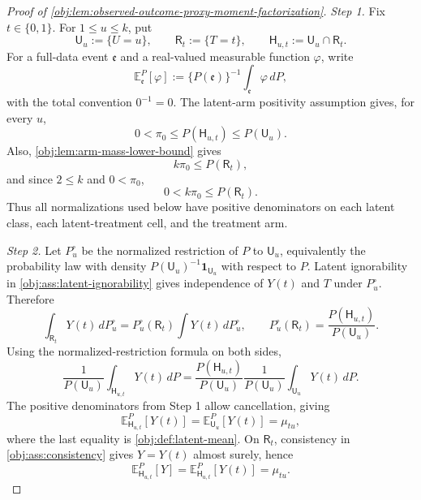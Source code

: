 \begin{proof}[Proof of \cref{obj:lem:observed-outcome-proxy-moment-factorization}]
\emph{Step 1.} Fix \(t\in\{0,1\}\).  For \(1\le u\le k\), put
\[
\mathsf U_u:=\{U=u\},\qquad
\mathsf R_t:=\{T=t\},\qquad
\mathsf H_{u,t}:=\mathsf U_u\cap\mathsf R_t .
\]
For a full-data event \(\mathfrak e\) and a real-valued measurable function \(\varphi\), write
\[
\mathbb E_{\mathfrak e}^{P}[\varphi]
:=
\{P(\mathfrak e)\}^{-1}\int_{\mathfrak e}\varphi\,dP,
\]
with the total convention \(0^{-1}=0\).  The latent-arm positivity assumption gives, for every \(u\),
\[
0<\pi_0\le P(\mathsf H_{u,t})\le P(\mathsf U_u).
\]
Also, \cref{obj:lem:arm-mass-lower-bound} gives
\[
k\pi_0\le P(\mathsf R_t),
\]
and since \(2\le k\) and \(0<\pi_0\),
\[
0<k\pi_0\le P(\mathsf R_t).
\]
Thus all normalizations used below have positive denominators on each latent class, each latent-treatment cell, and the treatment arm.

\emph{Step 2.} Let \(P_u^\circ\) be the normalized restriction of \(P\) to \(\mathsf U_u\), equivalently the probability law with density \(P(\mathsf U_u)^{-1}\mathbf 1_{\mathsf U_u}\) with respect to \(P\).  Latent ignorability in \cref{obj:ass:latent-ignorability} gives independence of \(Y(t)\) and \(T\) under \(P_u^\circ\).  Therefore
\[
\int_{\mathsf R_t}Y(t)\,dP_u^\circ
=
P_u^\circ(\mathsf R_t)\int Y(t)\,dP_u^\circ,
\qquad
P_u^\circ(\mathsf R_t)=\frac{P(\mathsf H_{u,t})}{P(\mathsf U_u)} .
\]
Using the normalized-restriction formula on both sides,
\[
\frac{1}{P(\mathsf U_u)}\int_{\mathsf H_{u,t}}Y(t)\,dP
=
\frac{P(\mathsf H_{u,t})}{P(\mathsf U_u)}
\frac{1}{P(\mathsf U_u)}\int_{\mathsf U_u}Y(t)\,dP .
\]
The positive denominators from Step 1 allow cancellation, giving
\[
\mathbb E_{\mathsf H_{u,t}}^{P}[Y(t)]
=
\mathbb E_{\mathsf U_u}^{P}[Y(t)]
=
\mu_{tu},
\]
where the last equality is \cref{obj:def:latent-mean}.  On \(\mathsf R_t\), consistency in \cref{obj:ass:consistency} gives \(Y=Y(t)\) almost surely, hence
\[
\mathbb E_{\mathsf H_{u,t}}^{P}[Y]
=
\mathbb E_{\mathsf H_{u,t}}^{P}[Y(t)]
=
\mu_{tu}.
\]


\end{proof}
